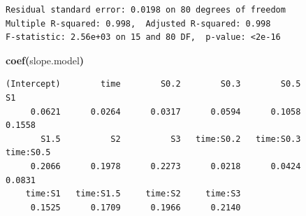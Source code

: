 \documentclass{article}
\makeatletter
\newcommand{\hlfunctioncall}[1]{\textcolor[rgb]{0.501960784313725,0,0.329411764705882}{\textbf{#1}}}%
\newcommand{\hlkeyword}[1]{\textcolor[rgb]{0,0,0}{\textbf{#1}}}%
\newcommand{\hlsymbol}[1]{\textcolor[rgb]{0,0,0}{#1}}%
\newenvironment{kframe}{%
 \def\FrameCommand##1{\hskip\@totalleftmargin \hskip-\fboxsep
 \colorbox{shadecolor}{##1}\hskip-\fboxsep
     \hskip-\linewidth \hskip-\@totalleftmargin \hskip\columnwidth}%
 \MakeFramed {\advance\hsize-\width
   \@totalleftmargin\z@ \linewidth\hsize
   \@setminipage}}%
 {\par\unskip\endMakeFramed}
\newenvironment{knitrout}{}{} %
\makeatother
\begin{document}
\begin{knitrout}
\begin{kframe}
\begin{verbatim}
Residual standard error: 0.0198 on 80 degrees of freedom
Multiple R-squared: 0.998,	Adjusted R-squared: 0.998 
F-statistic: 2.56e+03 on 15 and 80 DF,  p-value: <2e-16 

\end{verbatim}
\begin{flushleft}
\ttfamily\noindent
\hlfunctioncall{coef}\hlkeyword{(}\hlsymbol{slope.model}\hlkeyword{)}\mbox{}
\normalfont
\end{flushleft}
\begin{verbatim}
(Intercept)        time        S0.2        S0.3        S0.5          S1 
     0.0621      0.0264      0.0317      0.0594      0.1058      0.1558 
       S1.5          S2          S3   time:S0.2   time:S0.3   time:S0.5 
     0.2066      0.1978      0.2273      0.0218      0.0424      0.0831 
    time:S1   time:S1.5     time:S2     time:S3 
     0.1525      0.1709      0.1966      0.2140 
\end{verbatim}
\end{kframe}
\end{knitrout}
\end{document}
